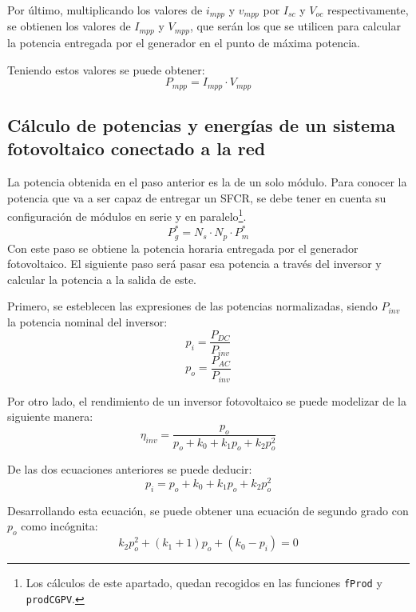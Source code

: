 Por último, multiplicando los valores de \(i_{mpp}\) y \(v_{mpp}\) por \(I_{sc}\) y \(V_{oc}\) respectivamente, se obtienen los valores de \(I_{mpp}\) y \(V_{mpp}\), que serán los que se utilicen para calcular la potencia entregada por el generador en el punto de máxima potencia.

Teniendo estos valores se puede obtener:
\begin{equation}
P_{mpp}=I_{mpp}\cdot V_{mpp}
\end{equation}

\subsection{Cálculo de potencias y energías de un sistema fotovoltaico conectado a la red}
\label{sec:orgbeacf32}
\label{subsec:calculo-potencias-energias}
La potencia obtenida en el paso anterior es la de un solo módulo. Para conocer la potencia que va a ser capaz de entregar un SFCR, se debe tener en cuenta su configuración de módulos en serie y en paralelo\footnote{Los cálculos de este apartado, quedan recogidos en las funciones \texttt{fProd} y \texttt{prodCGPV}.}.
\begin{equation}
P_g^*=N_s\cdot N_p\cdot P_m^*
\end{equation}
Con este paso se obtiene la potencia horaria entregada por el generador fotovoltaico. El siguiente paso será pasar esa potencia a través del inversor y calcular la potencia a la salida de este.

Primero, se esteblecen las expresiones de las potencias normalizadas, siendo \(P_{inv}\) la potencia nominal del inversor:
\begin{equation}
p_i=\frac{P_{DC}}{P_{inv}}
\end{equation}
\begin{equation}
p_o=\frac{P_{AC}}{P_{inv}}
\end{equation}

Por otro lado, el rendimiento de un inversor fotovoltaico se puede modelizar de la siguiente manera:
\begin{equation}
\eta_{inv}=\frac{p_o}{p_o+k_0+k_1p_o+k_2p_o^2}
\end{equation}

De las dos ecuaciones anteriores se puede deducir:
\begin{equation}
p_i=p_o+k_0+k_1p_o+k_2p_o^2
\end{equation}

Desarrollando esta ecuación, se puede obtener una ecuación de segundo grado con \(p_o\) como incógnita:
\begin{equation}
k_2p_o^2+(k_1+1)p_o+(k_0-p_i)=0
\end{equation}

